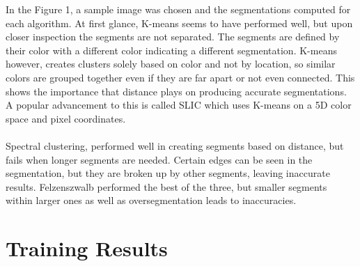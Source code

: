 \documentclass[12pt]{extarticle}
\begin{document}
    In the Figure 1, a sample image was chosen and the segmentations computed
    for each algorithm. At first glance, K-means seems to have performed well,
    but upon closer inspection the segments are not separated. The segments are 
    defined by their color with a different color indicating a different
    segmentation. K-means however, creates clusters solely based on color and 
    not by location, so similar colors are grouped together even if they are
    far apart or not even connected. This shows the importance that distance
    plays on producing accurate segmentations. A popular advancement to this
    is called SLIC which uses K-means on a 5D color space and pixel coordinates.
    \\
    \\
    Spectral clustering, performed well in creating segments based on distance,
    but fails when longer segments are needed. Certain edges can be seen in the
    segmentation, but they are broken up by other segments, leaving inaccurate
    results. Felzenszwalb performed the best of the three, but smaller
    segments within larger ones as well as oversegmentation leads to 
    inaccuracies.


  \section{Training Results}
\end{document}
